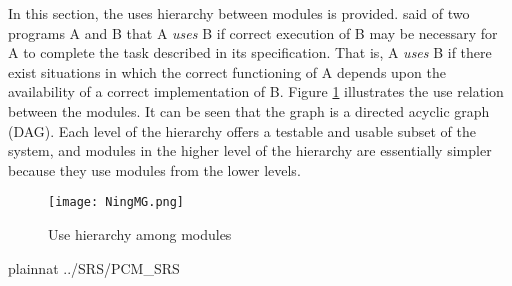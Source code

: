 \documentclass[12pt]{article}
\begin{document}
In this section, the uses hierarchy between modules is
provided. \citet{Parnas1978} said of two programs A and B that A {\em uses} B if
correct execution of B may be necessary for A to complete the task described in
its specification. That is, A {\em uses} B if there exist situations in which
the correct functioning of A depends upon the availability of a correct
implementation of B.  Figure \ref{FigUH} illustrates the use relation between
the modules. It can be seen that the graph is a directed acyclic graph
(DAG). Each level of the hierarchy offers a testable and usable subset of the
system, and modules in the higher level of the hierarchy are essentially simpler
because they use modules from the lower levels.

\begin{figure}[H]
\centering
\texttt{[image: NingMG.png]}
\caption{Use hierarchy among modules}
\label{FigUH}
\end{figure}


 {plainnat}
 {../SRS/PCM_SRS}
\end{document}

